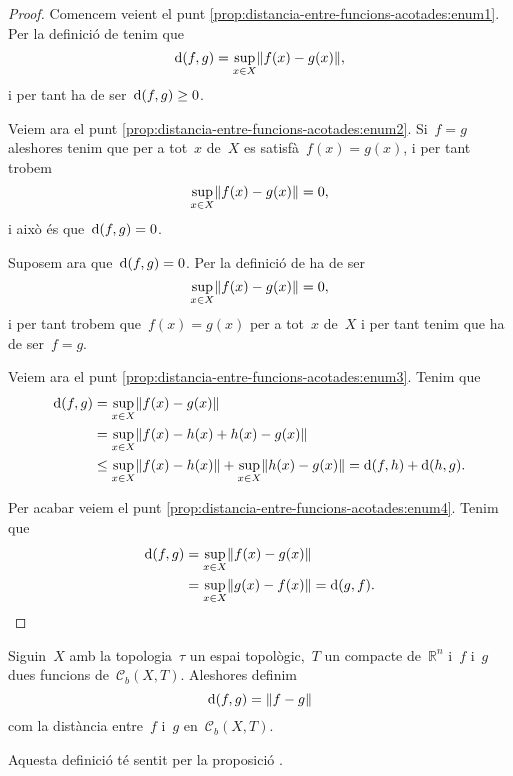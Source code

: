 \documentclass[../equacions-diferencials-I.tex]{subfiles}
\begin{document}
    \begin{proof}
        Comencem veient el punt \eqref{prop:distancia-entre-funcions-acotades:enum1}.
        Per la definició de  tenim que
        \[
            \distancia(f,g)=\sup_{x\in X}\norm{f(x)-g(x)},
        \]
        i per tant ha de ser~\(\operatorname{d}(f,g)\geq0\).

        Veiem ara el punt \eqref{prop:distancia-entre-funcions-acotades:enum2}.
        Si~\(f=g\) aleshores tenim que per a tot~\(x\) de~\(X\) es satisfà~\(f(x)=g(x)\), i per tant trobem
        \[
            \sup_{x\in X}\norm{f(x)-g(x)}=0,
        \]
        i això és que~\(\operatorname{d}(f,g)=0\).

        Suposem ara que~\(\operatorname{d}(f,g)=0\).
        Per la definició de  ha de ser
        \[
            \sup_{x\in X}\norm{f(x)-g(x)}=0,
        \]
        i per tant trobem que~\(f(x)=g(x)\) per a tot~\(x\) de~\(X\) i per tant tenim que ha de ser~\(f=g\).

        Veiem ara el punt \eqref{prop:distancia-entre-funcions-acotades:enum3}.
        Tenim que
        \begin{align*}
            \distancia(f,g)&=\sup_{x\in X}\norm{f(x)-g(x)} \\
            &=\sup_{x\in X}\norm{f(x)-h(x)+h(x)-g(x)} \\
            &\leq\sup_{x\in X}\norm{f(x)-h(x)}+\sup_{x\in X}\norm{h(x)-g(x)}=\distancia(f,h)+\distancia(h,g).
        \end{align*}

        Per acabar veiem el punt \eqref{prop:distancia-entre-funcions-acotades:enum4}.
        Tenim que
        \begin{align*}
            \distancia(f,g)&=\sup_{x\in X}\norm{f(x)-g(x)} \\
            &=\sup_{x\in X}\norm{g(x)-f(x)}=\distancia(g,f).\qedhere
        \end{align*}
    \end{proof}
    \begin{definition}
        \label{def:distancia-entre-funcions-acotades}
        Siguin~\(X\) amb la topologia~\(\tau\) un espai topològic,~\(T\) un compacte de~\(\mathbb{R}^{n}\) i~\(f\) i~\(g\) dues funcions de~\(\mathcal{C}_{b}(X,T)\).
        Aleshores definim
        \[
            \distancia(f,g)=\norm{f-g}
        \]
        com la distància entre~\(f\) i~\(g\) en~\(\mathcal{C}_{b}(X,T)\).

        Aquesta definició té sentit per la proposició .
    \end{definition}
\end{document}
